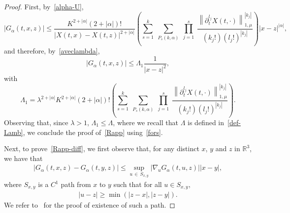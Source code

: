 \documentclass[10pt]{amsart}
\theoremstyle{definition}\newtheorem{defi}[theo]{Definition}\newtheorem{rema}[theo]{Remark}\newtheorem{exam}[theo]{Example}\newtheorem{exem}[theo]{Example}\newtheorem{nota}[theo]{Notation}
\newcommand{\R}{\mathbb{R}}
\renewcommand{\leq}{\leqslant}
\renewcommand{\geq}{\geqslant}
\begin{document}
\begin{proof}
First, by~\eqref{alpha-U},
\[
|G_\alpha(t,x,z)|\leq \frac{K^{2+|\alpha|}(2+|\alpha|)!}{|X(t,x)-X(t,z)|^{2+|\alpha|}}\left(\underset{s=1}{\overset{k}{\sum}}\;\underset{P_s(k,\alpha)}{\sum}\;\underset{j=1}{\overset{s}{\prod}}\;\frac{\left\|\partial_t^{l_j}X(t,\cdot)\right\|_{1,\mu}^{\left|k_j\right|}}{\left(k_j!\right) \left(l_j!\right)^{\left|k_j\right|}}\right)|x-z|^{|\alpha|},
\]
and therefore, by~\eqref{aveclambda},
\begin{equation}\label{borne_G}
|G_\alpha(t,x,z)| \leq \Lambda_1 \frac{1}{|x-z|^2},
\end{equation}
with
\[
\Lambda_1= \lambda^{2+|\alpha|}K^{2+|\alpha|}(2+|\alpha|)!\left(\underset{s=1}{\overset{k}{\sum}}\;\underset{P_s(k,\alpha)}{\sum}\;\underset{j=1}{\overset{s}{\prod}}\;\frac{\left\|\partial_t^{l_j}X(t,\cdot) \right\|_{1,\mu}^{\left|k_j\right|}}{\left(k_j!\right) \left(l_j!\right)^{\left|k_j\right|}}\right).
\]
Observing that, since $\lambda>1$, $ \Lambda_1 \leq \Lambda$, where we recall that $\Lambda$ is defined in~\eqref{def-Lamb}, we conclude the proof of~\eqref{Rapp} using~\eqref{fors}.

Next, to prove~\eqref{Rapp-diff}, we first observe that, for any distinct $x$, $y$ and $z$ in $\R^3$, we have that
\begin{align}\label{app1}
|G_\alpha(t,x,z)-G_\alpha(t,y,z)| \leq \underset{u\,\in\,S_{x,y}}{\sup}|\nabla_u G_\alpha(t,u,z)| |x-y|,
\end{align}
where $S_{x,y}$ is a $C^1$ path from $x$ to $y$ such that for all $u \in S_{x,y}$,
\begin{align}\label{app2}
|u-z| \geq \min(|z-x|,|z-y|).
\end{align}
We refer to~\cite[Lemma~3.15]{Hofer} for the proof of existence of such a path.


\end{proof}
\end{document}
